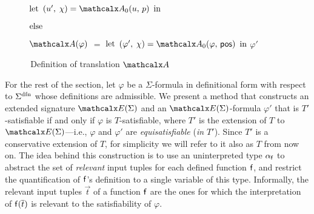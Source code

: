 \begin{figure}[t]
\begin{enumerate}
\begin{itemize}
\begin{itemize}
      \itemx[] $\textrm{let}$ $( u',\, \chi ) = \conv_0( u,\, p )$ $\textrm{in}$ 
    \end{itemize}
   \itemx[] $\textrm{else}$
   \begin{itemize}
     \itemx[] \return {}
   \end{itemize}
 \end{itemize}
\end{enumerate}
\begin{enumerate}
\itemx[\ ]
$\conv( \varphi )$ $=$ $\textrm{let}$ $( \varphi',\, \chi ) = \conv_0( \varphi,\, \ppos )$ $\textrm{in}$ $\varphi'$
\\[-1.5\baselineskip] %
\end{enumerate}
\caption{\,Definition of translation $\conv$}
\label{fig:A}
\end{figure}

For the rest of the section, let $\varphi$ be a $\Sigma$-formula
in definitional form with respect to $\sfundefs{\Sigma}$
whose definitions are admissible.
We present a method that constructs an extended signature
$\extendsig{ \Sigma }$ and an $\extendsig{ \Sigma }$-formula $\varphi'$ 
that is $T'$-satisfiable if and only if $\varphi$ is $T$-satisfiable,
where $T'$ is the extension of $T$ to $\extendsig{ \Sigma }$---i.e., $\varphi$ and $\varphi'$ 
are \emph{equisatisfiable} (\emph{in $T'$}).
Since $T'$ is a conservative extension of $T$, for simplicity
we will refer to it also as $T$ from now on.
The idea behind this construction is to use an uninterpreted type $\alpha_{\mathsf{f}}$
to abstract the set of
\emph{relevant} input tuples for each defined function $\mathsf{f}$, and restrict the
quantification of $\mathsf{f}$'s definition to a single variable of this type.
Informally, the relevant input tuples $\vec t$ of a function $\mathsf{f}$ are the
ones for which the interpretation of $\mathsf{f}( \overline{t} )$ is relevant to the
satisfiability of $\varphi$.

